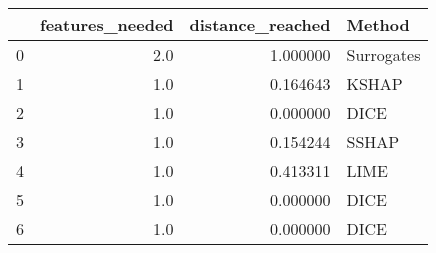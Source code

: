 \begin{tabular}{lrrl}
\toprule
{} &  features\_needed &  distance\_reached &      Method \\
\midrule
0 &              2.0 &          1.000000 &  Surrogates \\
1 &              1.0 &          0.164643 &       KSHAP \\
2 &              1.0 &          0.000000 &        DICE \\
3 &              1.0 &          0.154244 &       SSHAP \\
4 &              1.0 &          0.413311 &        LIME \\
5 &              1.0 &          0.000000 &        DICE \\
6 &              1.0 &          0.000000 &        DICE \\
\bottomrule
\end{tabular}
